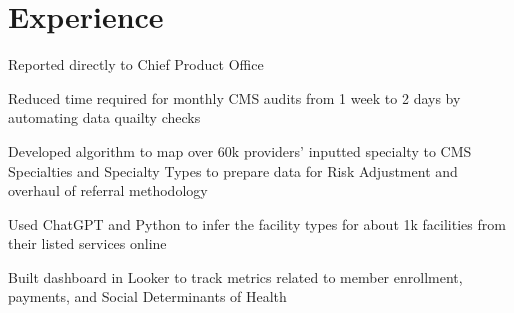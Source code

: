 \documentclass[a4paper]{deedy-resume-openfont} %
\begin{document}
\begin{minipage}[t]{0.66\textwidth} %

\section{Experience}

\vspace{\topsep} %
\begin{tightitemize}
	\item Reported directly to Chief Product Office%
   	\item Reduced time required for monthly CMS audits from 1 week to 2 days by automating data quailty checks
   	\item Developed algorithm to map over 60k providers' inputted specialty to CMS Specialties and Specialty Types to prepare data for Risk Adjustment and overhaul of referral methodology
   	\item Used ChatGPT and Python to infer the facility types for about 1k facilities from their listed services online
   	\item Built dashboard in Looker to track metrics related to member enrollment, payments, and Social Determinants of Health
\end{tightitemize}


\end{minipage}
\end{document}
